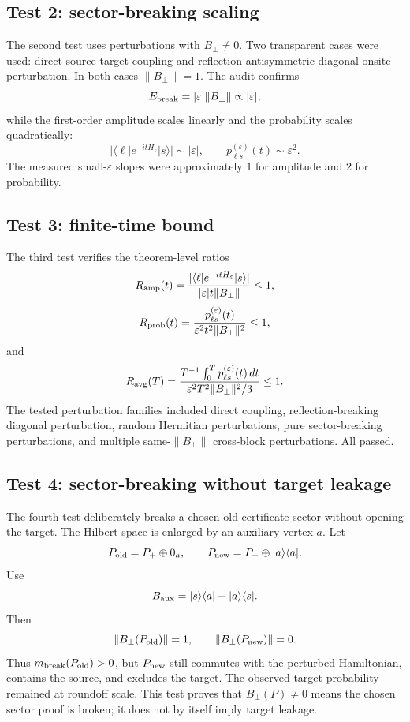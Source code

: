 \documentclass[11pt]{article}
\theoremstyle{definition}
\begin{document}
\subsection{Test 2: sector-breaking scaling}
The second test uses perturbations with $B_\perp\ne0$. Two transparent cases were used: direct source-target coupling and reflection-antisymmetric diagonal onsite perturbation. In both cases $\|B_\perp\|=1$. The audit confirms
\[
E_{\rm break}=|\varepsilon|\|B_\perp\|\propto |\varepsilon|,
\]
while the first-order amplitude scales linearly and the probability scales quadratically:
\[
|\langle \ell|e^{-itH_\varepsilon}|s\rangle|\sim |\varepsilon|,
\qquad p_{\ell s}^{(\varepsilon)}(t)\sim\varepsilon^2.
\]
The measured small-$\varepsilon$ slopes were approximately $1$ for amplitude and $2$ for probability.

\subsection{Test 3: finite-time bound}
The third test verifies the theorem-level ratios
\[
R_{\rm amp}(t)=\frac{|\langle \ell|e^{-itH_\varepsilon}|s\rangle|}{|\varepsilon|t\|B_\perp\|}\le1,
\]
\[
R_{\rm prob}(t)=\frac{p_{\ell s}^{(\varepsilon)}(t)}{\varepsilon^2t^2\|B_\perp\|^2}\le1,
\]
and
\[
R_{\rm avg}(T)=\frac{T^{-1}\int_0^T p_{\ell s}^{(\varepsilon)}(t)\,dt}{\varepsilon^2T^2\|B_\perp\|^2/3}\le1.
\]
The tested perturbation families included direct coupling, reflection-breaking diagonal perturbation, random Hermitian perturbations, pure sector-breaking perturbations, and multiple same-$\|B_\perp\|$ cross-block perturbations. All passed.

\subsection{Test 4: sector-breaking without target leakage}
The fourth test deliberately breaks a chosen old certificate sector without opening the target. The Hilbert space is enlarged by an auxiliary vertex $a$. Let
\[
P_{\rm old}=P_+\oplus0_a,
\qquad P_{\rm new}=P_+\oplus |a\rangle\langle a|.
\]
Use
\[
B_{\rm aux}=|s\rangle\langle a|+|a\rangle\langle s|.
\]
Then
\[
\|B_\perp(P_{\rm old})\|=1,
\qquad \|B_\perp(P_{\rm new})\|=0.
\]
Thus $m_{\rm break}(P_{\rm old})>0$, but $P_{\rm new}$ still commutes with the perturbed Hamiltonian, contains the source, and excludes the target. The observed target probability remained at roundoff scale. This test proves that $B_\perp(P)\ne0$ means the chosen sector proof is broken; it does not by itself imply target leakage.
\end{document}
